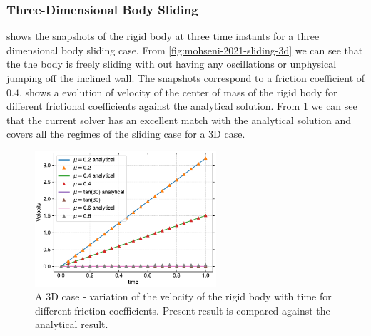 \subsubsection{Three-Dimensional Body Sliding}
\label{sec:results-3d-sliding}

 shows the snapshots of the rigid body at
three time instants for a three dimensional body sliding case. From
\cref{fig:mohseni-2021-sliding-3d} we can see that the the body is freely
sliding with out having any oscillations or unphysical jumping off the inclined
wall. The snapshots correspond to a friction coefficient of $0.4$.
 shows a evolution of
velocity of the center of mass of the rigid body for different frictional
coefficients against the analytical solution. From
\cref{fig:results-solid-sliding-velocity-vs-time-3d} we can see that the current
solver has an excellent match with the analytical solution and covers all the
regimes of the sliding case for a 3D case.
\begin{figure}[!htpb]
  \centering
  \includegraphics[width=0.6\textwidth]{figures/rfc/figures/mohseni_2021_free_sliding_on_a_slope_3d/velocity_vs_time}
  \caption{A 3D case - variation of the velocity of the rigid body with time for different
    friction coefficients. Present result is compared against the analytical
    result.}
\label{fig:results-solid-sliding-velocity-vs-time-3d}
\end{figure}

